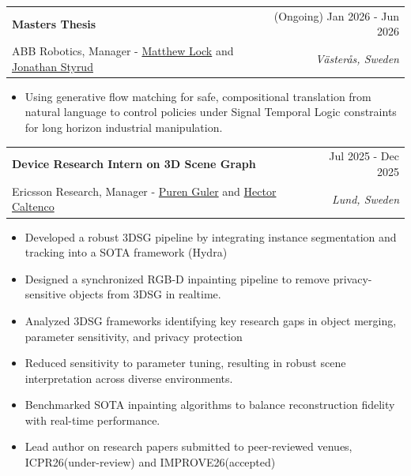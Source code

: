 \documentclass[letterpaper, 11pt]{article}
\makeatletter
\newcommand{\resumeItem}[1]{ \item\small{ {#1 \vspace{-2pt}} } }
\newcommand{\resumeSubheading}[4]{
\vspace{-1pt}
\item
\begin{tabular*}{1.0\textwidth}[t]{l@{\extracolsep{\fill}}r}
	\textbf{#1}       & {\small #2} \\
	{\small#3} & \textit{\small #4} \\
\end{tabular*}
\vspace{-10pt}
}
\newcommand{\resumeItemListStart}{\begin{itemize}[leftmargin=0.25in]}
\newcommand{\resumeItemListEnd}{\end{itemize}
\vspace{-5pt}}
\makeatother
\begin{document}
    \resumeSubheading{Masters Thesis}{(Ongoing) Jan 2026 - Jun 2026}{ABB Robotics, Manager - 
    \href{https://www.linkedin.com/in/matthewwilliamlock/}{Matthew Lock} and \href{https://www.linkedin.com/in/jonathan-styrud-99385864/?locale=en_US}{Jonathan Styrud}}{Västerås, Sweden} 
    \resumeItemListStart 
        \resumeItem{Using generative flow matching for safe, compositional translation from natural language to control policies under Signal Temporal Logic constraints for long horizon industrial manipulation.}
    \resumeItemListEnd
    
    \resumeSubheading{Device Research Intern on 3D Scene Graph}{Jul 2025 - Dec 2025}{Ericsson Research, Manager - 
    \href{https://se.linkedin.com/in/p\%C3\%BCren-g\%C3\%BCler-76457317}{{Puren Guler}} and 
    \href{https://se.linkedin.com/in/hcaltenco}{Hector Caltenco}}{Lund, Sweden} 
    \resumeItemListStart 
        \resumeItem{Developed a robust 3DSG pipeline by integrating instance segmentation and tracking into a SOTA framework (Hydra)}
        \resumeItem{Designed a synchronized RGB-D inpainting pipeline to remove privacy-sensitive objects from 3DSG in realtime.}
        \resumeItem{Analyzed 3DSG frameworks identifying key research gaps in object merging, parameter sensitivity, and privacy protection}        
        \resumeItem{Reduced sensitivity to parameter tuning, resulting in robust scene interpretation across diverse environments.}
        \resumeItem{Benchmarked SOTA inpainting algorithms to balance reconstruction fidelity with real-time performance. }
        \resumeItem{Lead author on research papers submitted to peer-reviewed venues, ICPR26(under-review) and IMPROVE26(accepted)} 
    \resumeItemListEnd
\end{document}
